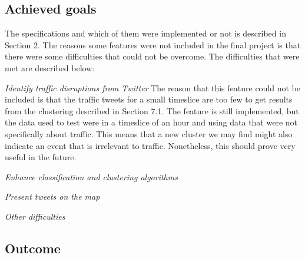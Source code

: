 \subsection{Achieved goals}
The specifications and which of them were implemented or not is described in
Section 2. The reasons some features were not included in the final project is
that there were some difficulties that could not be overcome.
The difficulties that were met are described below:

\emph{Identify traffic disruptions from Twitter}
The reason that this feature could not be included is that the traffic tweets
for a small timeslice are too few to get results from the clustering described
in Section 7.1. The feature is still implemented, but the data used to test
were in a timeslice of an hour and using data that were not specifically about
traffic. This means that a new cluster we may find might also indicate an
event that is irrelevant to traffic. Nonetheless, this should prove very useful
in the future.

\emph{Enhance classification and clustering algorithms}

\emph{Present tweets on the map}

\emph{Other difficulties}

\subsection{Outcome}
